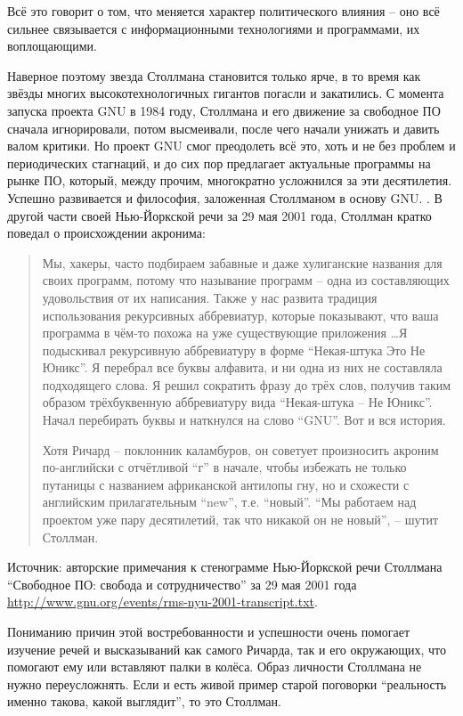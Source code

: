 Всё это говорит о том, что меняется характер политического влияния -- оно всё сильнее связывается с информационными технологиями и программами, их воплощающими. 

Наверное поэтому звезда Столлмана становится только ярче, в то время как звёзды многих высокотехнологичных гигантов погасли и закатились. С момента запуска проекта GNU в 1984 году, Столлмана и его движение за свободное ПО сначала игнорировали, потом высмеивали, после чего начали унижать и давить валом критики. Но проект GNU смог преодолеть всё это, хоть и не без проблем и периодических стагнаций, и до сих пор предлагает актуальные программы на рынке ПО, который, между прочим, многократно усложнился за эти десятилетия. Успешно развивается и философия, заложенная Столлманом в основу GNU. . В другой части своей Нью-Йоркской речи за 29 мая 2001 года, Столлман кратко поведал о происхождении акронима:

\begin{quote}
Мы, хакеры, часто подбираем забавные и даже хулиганские названия для своих программ, потому что называние программ -- одна из составляющих удовольствия от их написания. Также у нас развита традиция использования рекурсивных аббревиатур, которые показывают, что ваша программа в чём-то похожа на уже существующие приложения \ldots Я подыскивал рекурсивную аббревиатуру в форме ``Некая-штука Это Не Юникс''. Я перебрал все буквы алфавита, и ни одна из них не составляла подходящего слова. Я решил сократить фразу до трёх слов, получив таким образом трёхбуквенную аббревиатуру вида ``Некая-штука -- Не Юникс''. Начал перебирать буквы и наткнулся на слово ``GNU''. Вот и вся история.

Хотя Ричард -- поклонник каламбуров, он советует произносить акроним по-английски с отчётливой ``г'' в начале, чтобы избежать не только путаницы с названием африканской антилопы гну, но и схожести с английским прилагательным ``new'', т.е. ``новый''. ``Мы работаем над проектом уже пару десятилетий, так что никакой он не новый'', -- шутит Столлман.
\end{quote}

Источник: авторские примечания к стенограмме Нью-Йоркской речи Столлмана ``Свободное ПО: свобода и сотрудничество'' за 29 мая 2001 года \url{http://www.gnu.org/events/rms-nyu-2001-transcript.txt}.

Пониманию причин этой востребованности и успешности очень помогает изучение речей и высказываний как самого Ричарда, так и его окружающих, что помогают ему или вставляют палки в колёса. Образ личности Столлмана не нужно переусложнять. Если и есть живой пример старой поговорки ``реальность именно такова, какой выглядит'', то это Столлман.

